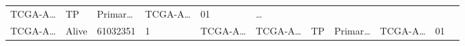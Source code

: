 \documentclass[
]{article}
\begin{document}
\begin{longtable}[]{@{}lllllllllll@{}}
\begin{minipage}[t]{0.07\columnwidth}
TCGA-A\ldots{}\strut
\end{minipage} & \begin{minipage}[t]{0.07\columnwidth}\raggedright
TP\strut
\end{minipage} & \begin{minipage}[t]{0.07\columnwidth}\raggedright
Primar\ldots{}\strut
\end{minipage} & \begin{minipage}[t]{0.09\columnwidth}\raggedright
TCGA-A\ldots{}\strut
\end{minipage} & \begin{minipage}[t]{0.10\columnwidth}\raggedright
01\strut
\end{minipage} & \begin{minipage}[t]{0.03\columnwidth}\raggedright
\ldots{}\strut
\end{minipage}\tabularnewline
\begin{minipage}[t]{0.07\columnwidth}\raggedright
TCGA-A\ldots{}\strut
\end{minipage} & \begin{minipage}[t]{0.04\columnwidth}\raggedright
Alive\strut
\end{minipage} & \begin{minipage}[t]{0.06\columnwidth}\raggedright
61032351\strut
\end{minipage} & \begin{minipage}[t]{0.07\columnwidth}\raggedright
1\strut
\end{minipage} & \begin{minipage}[t]{0.07\columnwidth}\raggedright
TCGA-A\ldots{}\strut
\end{minipage} & \begin{minipage}[t]{0.07\columnwidth}\raggedright
TCGA-A\ldots{}\strut
\end{minipage} & \begin{minipage}[t]{0.07\columnwidth}\raggedright
TP\strut
\end{minipage} & \begin{minipage}[t]{0.07\columnwidth}\raggedright
Primar\ldots{}\strut
\end{minipage} & \begin{minipage}[t]{0.09\columnwidth}\raggedright
TCGA-A\ldots{}\strut
\end{minipage} & \begin{minipage}[t]{0.10\columnwidth}\raggedright
01\strut
\end{minipage} & \begin{minipage}[t]{0.03\columnwidth}\raggedright

\end{minipage}
\end{longtable}
\end{document}

